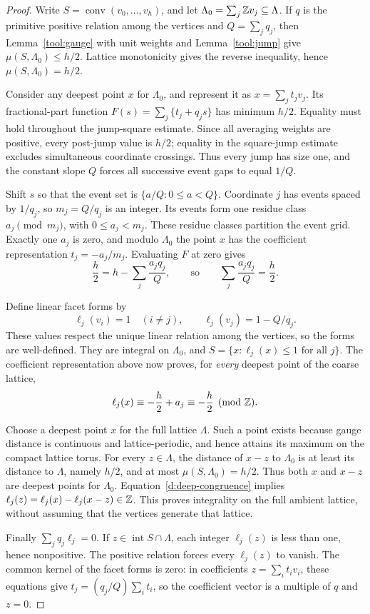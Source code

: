 \documentclass[11pt,a4paper]{article}
\theoremstyle{remark}\newtheorem{remark}[theorem]{Remark}
\DeclareMathOperator{\conv}{conv}
\DeclareMathOperator{\inter}{int}
\begin{document}
\begin{proof}
Write $S=\conv(v_0,\ldots,v_h)$, and let
$\Lambda_0=\sum_j\mathbb Z v_j\subseteq\Lambda$. If $q$ is the primitive
positive relation among the vertices and $Q=\sum_jq_j$, then
Lemma~\ref{tool:gauge} with unit weights and
Lemma~\ref{tool:jump} give $\mu(S,\Lambda_0)\le h/2$.
Lattice monotonicity gives the reverse inequality, hence
$\mu(S,\Lambda_0)=h/2$.

Consider any deepest point $x$ for $\Lambda_0$, and represent it
as $x=\sum_jt_jv_j$. Its fractional-part function
$F(s)=\sum_j\{t_j+q_js\}$ has minimum $h/2$. Equality must hold
throughout the jump-square estimate. Since all averaging weights
are positive, every post-jump value is $h/2$; equality in the
square-jump estimate excludes simultaneous coordinate crossings.
Thus every jump has size one, and the constant slope $Q$ forces
all successive event gaps to equal $1/Q$.

Shift $s$ so that the event set is $\{a/Q:0\le a<Q\}$.
Coordinate $j$ has events spaced by $1/q_j$, so
$m_j=Q/q_j$ is an integer. Its events form one residue class
$a_j\pmod {m_j}$, with $0\le a_j<m_j$. These residue classes
partition the event grid. Exactly one $a_j$ is zero, and modulo
$\Lambda_0$ the point $x$ has the coefficient representation
$t_j=-a_j/m_j$. Evaluating $F$ at zero gives
\[
 \frac h2=h-\sum_j\frac{a_jq_j}{Q},
 \qquad\text{so}\qquad
 \sum_j\frac{a_jq_j}{Q}=\frac h2.
\]

Define linear facet forms by
\[
 \ell_j(v_i)=1\quad(i\ne j),\qquad
 \ell_j(v_j)=1-Q/q_j.
\]
These values respect the unique linear relation among the vertices,
so the forms are well-defined. They are integral on $\Lambda_0$,
and $S=\{x:\ell_j(x)\le1\text{ for all }j\}$.
The coefficient representation above now proves, for \emph{every}
deepest point of the coarse lattice,
\begin{equation}\label{d:deep-congruence}
 \ell_j(x)\equiv-\frac h2+a_j
 \equiv-\frac h2\pmod{\mathbb Z}.
\end{equation}

Choose a deepest point $x$ for the full lattice $\Lambda$.
Such a point exists because gauge distance is continuous and
lattice-periodic, and hence attains its maximum on the compact
lattice torus. For every $z\in\Lambda$, the distance of $x-z$
to $\Lambda_0$ is at least its distance to $\Lambda$, namely $h/2$,
and at most $\mu(S,\Lambda_0)=h/2$. Thus both $x$ and $x-z$ are
deepest points for $\Lambda_0$. Equation~\eqref{d:deep-congruence}
implies $\ell_j(z)=\ell_j(x)-\ell_j(x-z)\in\mathbb Z$.
This proves integrality on the full ambient lattice, without
assuming that the vertices generate that lattice.

Finally $\sum_jq_j\ell_j=0$. If $z\in\inter S\cap\Lambda$,
each integer $\ell_j(z)$ is less than one, hence nonpositive.
The positive relation forces every $\ell_j(z)$ to vanish.
The common kernel of the facet forms is zero: in coefficients
$z=\sum_i t_iv_i$, these equations give
$t_j=(q_j/Q)\sum_i t_i$, so the coefficient vector is a multiple
of $q$ and $z=0$.
\end{proof}
\end{document}
